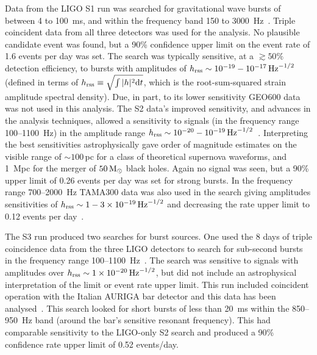 \documentclass{article}
\begin{document}
Data from the LIGO S1 run was searched for gravitational wave bursts of between
4 to 100~ms, and within the frequency band 150 to 3000~Hz~\cite{Abbott:2004b}.
Triple coincident data from all three detectors was used for the analysis. No
plausible candidate event was found, but a 90\% confidence upper limit on the
event rate of 1.6 events per day was set. The search was typically sensitive, at
a $\gtrsim50\%$ detection efficiency, to bursts with amplitudes of $h_{\rm
rss}\sim10^{-19}-10^{-17}\,{\rm Hz}^{-1/2}$ (defined in terms of $h_{\rm
rss} \equiv \sqrt{\int|h|^2{\rm d}t}$, which is the root-sum-squared strain
amplitude spectral density). Due, in part, to its lower sensitivity GEO600 data
was not used in this analysis. The S2 data's improved sensitivity, and advances
in the analysis techniques, allowed a sensitivity to signals (in the frequency
range 100--1100~Hz) in the amplitude range $h_{\rm
rss}\sim10^{-20}-10^{-19}\,{\rm Hz}^{-1/2}$~\cite{Abbott:2005a}. Interpreting
the best sensitivities astrophysically gave order of magnitude estimates on the
visible range of $\sim100$\,pc for a class of theoretical supernova waveforms,
and 1~Mpc for the merger of $50\,{\rm M}_{\odot}$ black holes. Again no signal
was seen, but a 90\% upper limit of 0.26 events per day was set for strong
bursts. In the frequency range 700--2000~Hz TAMA300 data was also used in the
search giving amplitudes sensitivities of $h_{\rm
rss}\sim1-3\times10^{-19}\,{\rm Hz}^{-1/2}$ and decreasing the rate upper limit
to 0.12 events per day~\cite{Abbott:2005c}.

The S3 run produced two searches for burst sources. One used the 8 days of
triple coincidence data from the three LIGO detectors to search for sub-second
bursts in the frequency range 100--1100~Hz~\cite{Abbott:2006a}. The search was
sensitive to signals with amplitudes over $h_{\rm rss}\sim1\times10^{-20}\,{\rm
Hz}^{-1/2}$, but did not include an astrophysical interpretation of the limit or
event rate upper limit. This run included coincident operation with the Italian
AURIGA bar detector and this data has been analysed~\cite{Baggio:2008}. This
search looked for short bursts of less than 20~ms within the 850--950~Hz band
(around the bar's sensitive resonant frequency). This had comparable sensitivity
to the LIGO-only S2 search and produced a 90\% confidence rate upper limit of
0.52 events/day.
\end{document}
